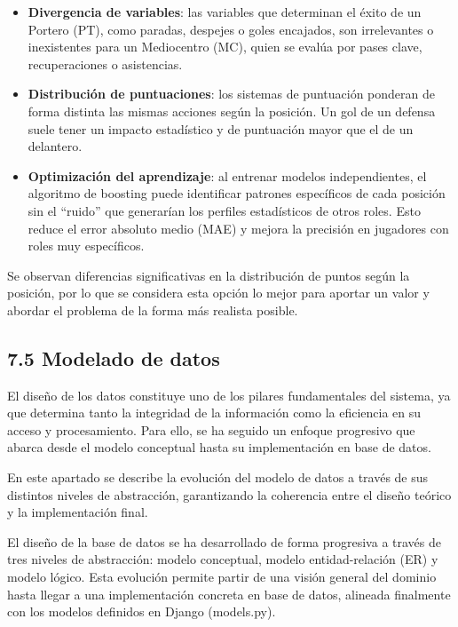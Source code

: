 \begin{itemize}
\item \textbf{Divergencia de variables}: las variables que determinan el éxito de
un Portero (PT), como paradas, despejes o goles encajados, son irrelevantes o
inexistentes para un Mediocentro (MC), quien se evalúa por pases clave,
recuperaciones o asistencias.

\item \textbf{Distribución de puntuaciones}: los sistemas de puntuación ponderan
de forma distinta las mismas acciones según la posición. Un gol de un defensa
suele tener un impacto estadístico y de puntuación mayor que el de un delantero.

\item \textbf{Optimización del aprendizaje}: al entrenar modelos independientes,
el algoritmo de boosting puede identificar patrones específicos de cada posición
sin el ``ruido'' que generarían los perfiles estadísticos de otros roles. Esto
reduce el error absoluto medio (MAE) y mejora la precisión en jugadores con
roles muy específicos.
\end{itemize}

Se observan diferencias significativas en la distribución de puntos según la
posición, por lo que se considera esta opción lo mejor para aportar un valor y
abordar el problema de la forma más realista posible.


\subsection{7.5 Modelado de datos}
El diseño de los datos constituye uno de los pilares fundamentales del sistema,
ya que determina tanto la integridad de la información como la eficiencia en su
acceso y procesamiento. Para ello, se ha seguido un enfoque progresivo que
abarca desde el modelo conceptual hasta su implementación en base de datos.

En este apartado se describe la evolución del modelo de datos a través de sus
distintos niveles de abstracción, garantizando la coherencia entre el diseño
teórico y la implementación final.

El diseño de la base de datos se ha desarrollado de forma progresiva a través de
tres niveles de abstracción: modelo conceptual, modelo entidad-relación (ER) y
modelo lógico. Esta evolución permite partir de una visión general del dominio
hasta llegar a una implementación concreta en base de datos, alineada finalmente
con los modelos definidos en Django (models.py).


